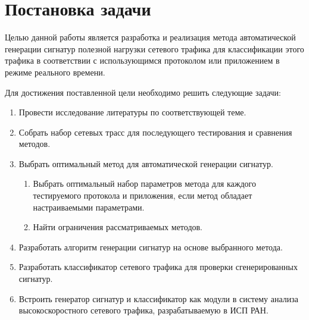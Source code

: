 \section{Постановка задачи}
\label{sec:Section1} 

Целью данной работы является разработка и реализация метода автоматической генерации сигнатур полезной нагрузки сетевого трафика
для классификации этого трафика в соответствии с использующимся протоколом или приложением в режиме реального времени.

Для достижения поставленной цели необходимо решить следующие задачи:

\begin{enumerate}
    \item Провести исследование литературы по соответствующей теме.
    \item Собрать набор сетевых трасс для последующего тестирования и сравнения методов.
    \item Выбрать оптимальный метод для автоматической генерации сигнатур.
    \begin{enumerate}
        \item Выбрать оптимальный набор параметров метода для каждого тестируемого протокола и приложения, если метод обладает настраиваемыми параметрами.
        \item Найти ограничения рассматриваемых методов.
    \end{enumerate}
    \item Разработать алгоритм генерации сигнатур на основе выбранного метода.
    \item Разработать классификатор сетевого трафика для проверки сгенерированных сигнатур.
    \item Встроить генератор сигнатур и классификатор как модули в систему анализа высокоскоростного сетевого трафика, разрабатываемую в ИСП РАН.
\end{enumerate}

\newpage
